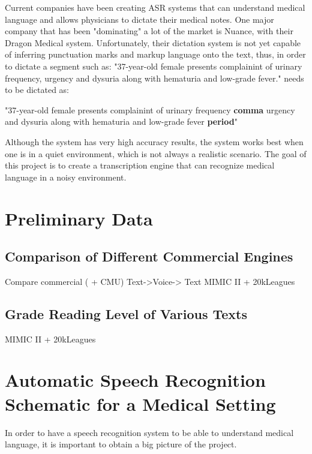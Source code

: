 Current companies have been creating ASR systems that can understand medical language and allows physicians to dictate their medical notes. One major company that has been "dominating" a lot of the market is Nuance, with their Dragon Medical system. Unfortunately, their dictation system is not yet capable of inferring punctuation marks and markup language onto the text, thus, in order to dictate a segment such as: "37-year-old female presents complainint of urinary frequency, urgency and dysuria along with hematuria and low-grade fever." needs to be dictated as:

\begin{center}
    "37-year-old female presents complainint of urinary frequency \textbf{comma} urgency and dysuria along with hematuria and low-grade fever \textbf{period}"
\end{center}

Although the system has very high accuracy results, the system works best when one is in a quiet environment, which is not always a realistic scenario. The goal of this project is to create a transcription engine that can recognize medical language in a noisy environment.

\section{Preliminary Data}

\subsection{Comparison of Different Commercial Engines}

Compare commercial ( + CMU)
Text->Voice-> Text
MIMIC II + 20kLeagues


\subsection{Grade Reading Level of Various Texts}
MIMIC II + 20kLeagues

\section{Automatic Speech Recognition Schematic for a Medical Setting}

In order to have a speech recognition system to be able to understand medical language, it is important to obtain a big picture of the project.

